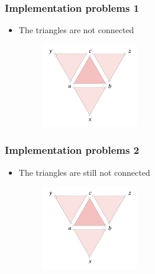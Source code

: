 \documentclass{beamer}
\begin{document}
\begin{frame}[t]
    \frametitle{Implementation problems 1}
    \begin{itemize}
        \item The triangles are not connected
            \begin{figure}[h]
                \begin{center}
                    \includegraphics[width=0.4\textwidth]{triangles.png}
                \end{center}
            \end{figure}
    \end{itemize}
\end{frame}
\begin{frame}[t]
    \frametitle{Implementation problems 2}
    \begin{itemize}
        \item The triangles are still not connected
            \begin{figure}[h]
                \begin{center}
                    \includegraphics[width=0.4\textwidth]{triangles.png}
                \end{center}
            \end{figure}
    \end{itemize}
\end{frame}
\end{document}
